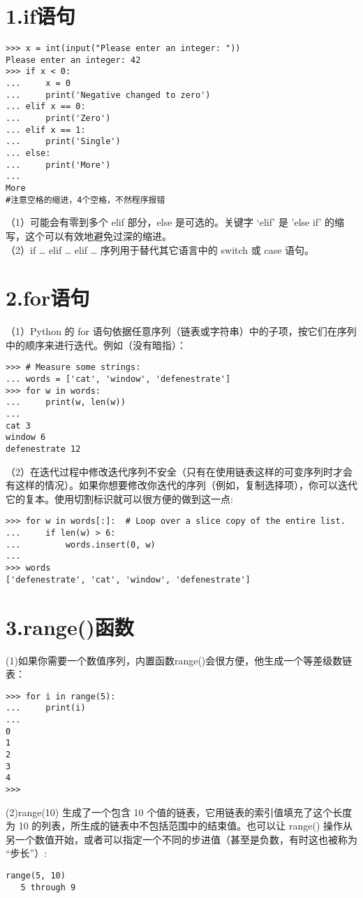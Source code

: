 \documentclass{article}
\begin{document}
\begin{CJK}{UTF8}{gbsn}
\section*{1.if语句}
\begin{verbatim}
>>> x = int(input("Please enter an integer: "))
Please enter an integer: 42
>>> if x < 0:
...     x = 0
...     print('Negative changed to zero')
... elif x == 0:
...     print('Zero')
... elif x == 1:
...     print('Single')
... else:
...     print('More')
... 
More
#注意空格的缩进，4个空格，不然程序报错
\end{verbatim}
（1）可能会有零到多个 elif 部分，else 是可选的。关键字 ‘elif’ 是 ’else if’ 的缩写，这个可以有效地避免过深的缩进。\\
（2）if … elif … elif … 序列用于替代其它语言中的 switch 或 case 语句。
\section*{2.for语句}
（1）Python 的 for 语句依据任意序列（链表或字符串）中的子项，按它们在序列中的顺序来进行迭代。例如（没有暗指）：
\begin{verbatim}
>>> # Measure some strings:
... words = ['cat', 'window', 'defenestrate']
>>> for w in words:
...     print(w, len(w))
...
cat 3
window 6
defenestrate 12
\end{verbatim}
（2）在迭代过程中修改迭代序列不安全（只有在使用链表这样的可变序列时才会有这样的情况）。如果你想要修改你迭代的序列（例如，复制选择项），你可以迭代它的复本。使用切割标识就可以很方便的做到这一点:
\begin{verbatim}
>>> for w in words[:]:  # Loop over a slice copy of the entire list.
...     if len(w) > 6:
...         words.insert(0, w)
...
>>> words
['defenestrate', 'cat', 'window', 'defenestrate']
\end{verbatim}
\section*{3.range()函数}
(1)如果你需要一个数值序列，内置函数range()会很方便，他生成一个等差级数链表：
\begin{verbatim}
>>> for i in range(5):
...     print(i)
... 
0
1
2
3
4
>>> 
\end{verbatim}
(2)range(10) 生成了一个包含 10 个值的链表，它用链表的索引值填充了这个长度为 10 的列表，所生成的链表中不包括范围中的结束值。也可以让 range() 操作从另一个数值开始，或者可以指定一个不同的步进值（甚至是负数，有时这也被称为 “步长”）:
\begin{verbatim}
range(5, 10)
   5 through 9


\end{verbatim}
\end{CJK}
\end{document}

